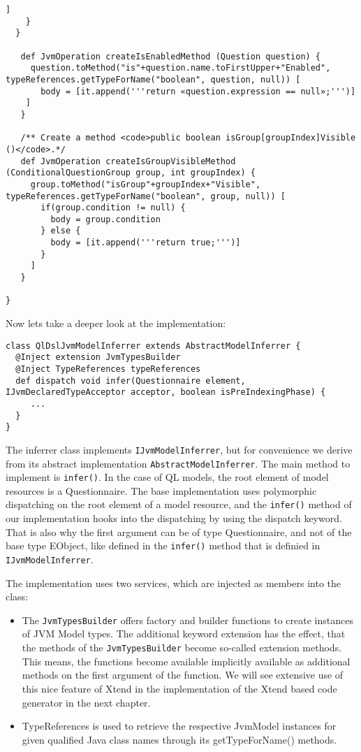 \begin{lstlisting}[language=Xtend]
      ]
    }
  }

   def JvmOperation createIsEnabledMethod (Question question) {
     question.toMethod("is"+question.name.toFirstUpper+"Enabled", typeReferences.getTypeForName("boolean", question, null)) [
       body = [it.append('''return «question.expression == null»;''')]
    ]
   }

   /** Create a method <code>public boolean isGroup[groupIndex]Visible ()</code>.*/
   def JvmOperation createIsGroupVisibleMethod (ConditionalQuestionGroup group, int groupIndex) {
     group.toMethod("isGroup"+groupIndex+"Visible", typeReferences.getTypeForName("boolean", group, null)) [
       if(group.condition != null) {
         body = group.condition
       } else {
         body = [it.append('''return true;''')]
       }
     ]
   }

}
\end{lstlisting}

Now lets take a deeper look at the implementation:

\begin{lstlisting}[language=Xtend]
class QlDslJvmModelInferrer extends AbstractModelInferrer {
  @Inject extension JvmTypesBuilder
  @Inject TypeReferences typeReferences
  def dispatch void infer(Questionnaire element, IJvmDeclaredTypeAcceptor acceptor, boolean isPreIndexingPhase) {
     ...
  }
}
\end{lstlisting}

The inferrer class implements \texttt{IJvmModelInferrer}, but for convenience we derive
from its abstract implementation \texttt{AbstractModelInferrer}. The main method to
implement is \texttt{infer()}. In the case of QL models, the root element
of model resources is a Questionnaire. The base implementation uses polymorphic dispatching on
the root element of a model resource, and the \texttt{infer()} method of our
implementation hooks into the dispatching by using the dispatch keyword. That is
also why the first argument can be of type Questionnaire, and not of the base
type EObject, like defined in the \texttt{infer()} method that is definied in
\texttt{IJvmModelInferrer}.

The implementation uses two services, which are injected as members into the
class:
\begin{itemize}
\item The \texttt{JvmTypesBuilder} offers factory and builder functions to create
instances of JVM Model types. The additional keyword extension has the effect,
that the methods of the \texttt{JvmTypesBuilder} become so-called extension methods.
This means, the functions become available implicitly available as additional
methods on the first argument of the function. We will see extensive use of this
nice feature of Xtend in the implementation of the Xtend based code generator in
the next chapter.
\item TypeReferences is used to retrieve the respective JvmModel instances for
given qualified Java class names through its getTypeForName() methods. 
\end{itemize}

